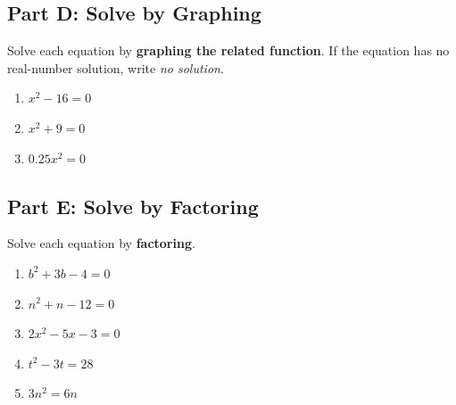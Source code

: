 \documentclass[12pt]{article}
\begin{document}
\subsection*{Part D: Solve by Graphing}

\noindent Solve each equation by \textbf{graphing the related function}. If the equation has no real-number solution, write \textit{no solution}.

\begin{enumerate}[leftmargin=*, label=\textbf{\arabic*.}, start=14]

  \item $x^2 - 16 = 0$
  \vspace{3.5cm}

  \item $x^2 + 9 = 0$
  \vspace{3.5cm}

  \item $0.25x^2 = 0$
  \vspace{3.5cm}

\end{enumerate}

\subsection*{Part E: Solve by Factoring}

\noindent Solve each equation by \textbf{factoring}.

\begin{enumerate}[leftmargin=*, label=\textbf{\arabic*.}, start=17]

  \item $b^2 + 3b - 4 = 0$

  \vspace{2.5cm}

  \item $n^2 + n - 12 = 0$

  \vspace{2.5cm}

  \item $2x^2 - 5x - 3 = 0$

  \vspace{2.5cm}

  \item $t^2 - 3t = 28$

  \vspace{2.5cm}

  \item $3n^2 = 6n$

  \vspace{2.5cm}

\end{enumerate}
\end{document}
